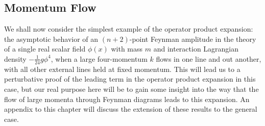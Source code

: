 \subsection[Momentum Flow]{Momentum Flow\footnotemark}
\label{sec:20.2}

We shall now consider the simplest example of the operator product expansion:
the asymptotic behavior of an $(n+2)$-point Feynman amplitude in the theory
of a single real scalar field $\phi(x)$ with mass $m$ and interaction
Lagrangian density $-\frac{1}{24}g\phi^4$, when a large four-momentum $k$
flows in one line and out another, with all other external lines held at
fixed momentum. This will lead us to a perturbative proof of the leading term
in the operator product expansion in this case, but our real purpose here
will be to gain some insight into the way that the flow of large momenta
through Feynman diagrams leads to this expansion. An appendix to this chapter
will discuss the extension of these results to the general case.

